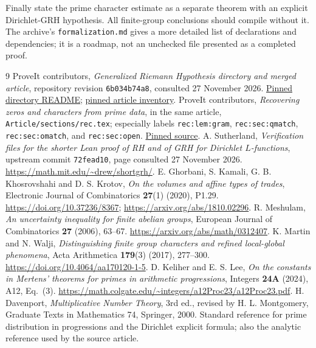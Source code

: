 \documentclass[11pt]{article}
\theoremstyle{definition}
\theoremstyle{remark}
\newcommand{\repo}{https://github.com/VladimirReshetnikov/ProveIt}
\newcommand{\pin}{6b034b74a8224c893e7e83127f33cd1a6958785d}
\newcommand{\sourcebase}{\repo/blob/\pin/Analysis/GeneralizedRiemannHypothesis}
\begin{document}
Finally state the prime character estimate as a separate theorem with an explicit Dirichlet-GRH hypothesis. All finite-group conclusions should compile without it. The archive's \texttt{formalization.md} gives a more detailed list of declarations and dependencies; it is a roadmap, not an unchecked file presented as a completed proof.

\begin{thebibliography}{9}
 ProveIt contributors, \emph{Generalized Riemann Hypothesis directory and merged article}, repository revision \texttt{6b034b74a8}, consulted 27 November 2026. \href{\sourcebase/README.md}{Pinned directory README}; \href{\sourcebase/Article/README.md}{pinned article inventory}.
 ProveIt contributors, \emph{Recovering zeros and characters from prime data}, in the same article, \texttt{Article/sections/rec.tex}; especially labels \texttt{rec:lem:gram}, \texttt{rec:sec:qmatch}, \texttt{rec:sec:omatch}, and \texttt{rec:sec:open}. \href{\sourcebase/Article/sections/rec.tex}{Pinned source}.
 A. Sutherland, \emph{Verification files for the shorter Lean proof of RH and of GRH for Dirichlet $L$-functions}, upstream commit \texttt{72fead10}, page consulted 27 November 2026. \url{https://math.mit.edu/~drew/shortgrh/}.
 E. Ghorbani, S. Kamali, G. B. Khosrovshahi and D. S. Krotov, \emph{On the volumes and affine types of trades}, Electronic Journal of Combinatorics \textbf{27}(1) (2020), P1.29. \url{https://doi.org/10.37236/8367}; \url{https://arxiv.org/abs/1810.02296}.
 R. Meshulam, \emph{An uncertainty inequality for finite abelian groups}, European Journal of Combinatorics \textbf{27} (2006), 63--67. \url{https://arxiv.org/abs/math/0312407}.
 K. Martin and N. Walji, \emph{Distinguishing finite group characters and refined local-global phenomena}, Acta Arithmetica \textbf{179}(3) (2017), 277--300. \url{https://doi.org/10.4064/aa170120-1-5}.
 D. Keliher and E. S. Lee, \emph{On the constants in Mertens' theorems for primes in arithmetic progressions}, Integers \textbf{24A} (2024), A12, Eq.~(3). \url{https://math.colgate.edu/~integers/a12Proc23/a12Proc23.pdf}.
 H. Davenport, \emph{Multiplicative Number Theory}, 3rd ed., revised by H. L. Montgomery, Graduate Texts in Mathematics 74, Springer, 2000. Standard reference for prime distribution in progressions and the Dirichlet explicit formula; also the analytic reference used by the source article.
\end{thebibliography}
\end{document}

